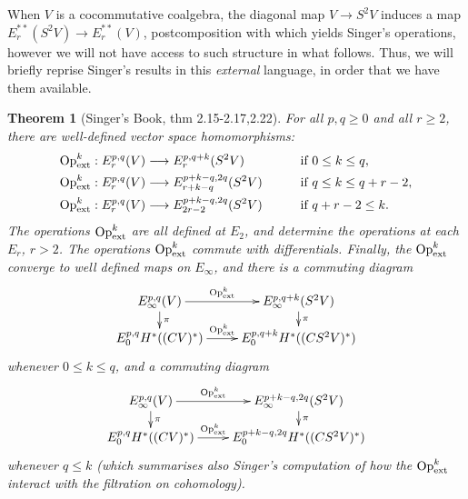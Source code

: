 \documentclass[11pt]{amsart}
\theoremstyle{plain}
\newtheorem{thm}{Theorem}[section]
\theoremstyle{definition}
\renewcommand{\to}{\longrightarrow}
\theoremstyle{plain}
\newcommand{\ExtCohOp}{\textup{Op}_\textup{ext}}
\begin{document}
\begin{Composite functor spectral sequences}
When $V$ is a cocommutative coalgebra, the diagonal map $V\to S^2V$ induces a map $E_r^{**}(S^2V)\to E_r^{**}(V)$, postcomposition with which yields Singer's operations, however we will not have access to such structure in what follows. Thus, we will briefly reprise Singer's results in this \emph{external} language, in order that we have them available.
\begin{thm}[Singer's Book, thm 2.15-2.17,2.22]
For all $p,q\geq0$ and all $r\geq2$, there are well-defined vector space homomorphisms:
\begin{alignat*}{2}
\ExtCohOp^k:E^{p,q}_r(V)&\to E^{p,q+k}_r(S^2V)&\qquad&\text{if }0\leq k \leq q,\\
\ExtCohOp^k:E^{p,q}_r(V)&\to E^{p+k-q,2q}_{r+k-q}(S^2V)&\qquad&\text{if }q\leq k\leq q+r-2,\\
\ExtCohOp^k:E^{p,q}_r(V)&\to E^{p+k-q,2q}_{2r-2}(S^2V)&\qquad&\text{if }q+r-2\leq k.
\end{alignat*}
The operations $\ExtCohOp^k$ are all defined at $E_2$, and determine the operations at each $E_r$, $r>2$. The operations $\ExtCohOp^k$ commute with differentials. Finally, the $\ExtCohOp^k$ converge to well defined maps on $E_\infty$, and there is a commuting diagram
\[\xymatrix@R=4mm{
E^{p,q}_\infty(V)\ar[r]^-{\ExtCohOp^k}\ar[d]^-{\pi}
&%
E^{p,q+k}_\infty(S^2V)\ar[d]^-{\pi}
\\%
E_0^{p,q}H^*((CV)^*)\ar[r]^-{\ExtCohOp^k}&%
E_0^{p,q+k}H^*((CS^2V)^*)%
}\]
whenever $0\leq k\leq q$, and a commuting diagram
\[\xymatrix@R=4mm{
E^{p,q}_\infty(V)\ar[r]^-{\ExtCohOp^k}\ar[d]^-{\pi}
&%
E^{p+k-q,2q}_\infty(S^2V)\ar[d]^-{\pi}
\\%
E_0^{p,q}H^*((CV)^*)\ar[r]^-{\ExtCohOp^k}&%
E_0^{p+k-q,2q}H^*((CS^2V)^*)%
}\]
whenever $q\leq k$ (which summarises also Singer's computation of how the $\ExtCohOp^k$ interact with the filtration on cohomology).


\end{thm}
\end{Composite functor spectral sequences}
\end{document}
